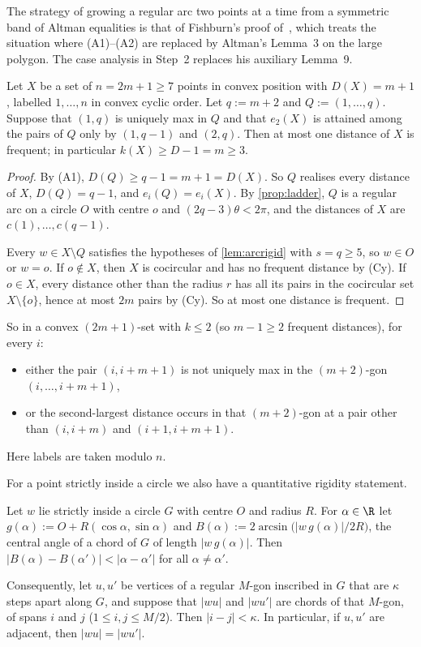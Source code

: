 The strategy of growing a regular arc two points at a time from a symmetric band of Altman equalities is that of Fishburn's proof of~\cite[Lemma~6]{Fi95}, which treats the situation where (A1)--(A2) are replaced by Altman's Lemma~3 on the large polygon. The case analysis in Step~2 replaces his auxiliary Lemma~9.

\begin{corollary}\label{cor:ladder}
Let $X$ be a set of $n=2m+1\ge7$ points in convex position with $D(X)=m+1$, labelled $1,\dots,n$ in convex cyclic order. Let $q:=m+2$ and $Q:=(1,\dots,q)$. Suppose that $(1,q)$ is uniquely max in $Q$ and that $e_2(X)$ is attained among the pairs of $Q$ only by $(1,q-1)$ and $(2,q)$. Then at most one distance of $X$ is frequent; in particular $k(X)\ge D-1=m\ge3$.
\end{corollary}

\begin{proof}
By (A1), $D(Q)\ge q-1=m+1=D(X)$. So $Q$ realises every distance of $X$, $D(Q)=q-1$, and $e_i(Q)=e_i(X)$. By \cref{prop:ladder}, $Q$ is a regular arc on a circle $O$ with centre $o$ and $(2q-3)\theta<2\pi$, and the distances of $X$ are $c(1),\dots,c(q-1)$.

Every $w\in X\setminus Q$ satisfies the hypotheses of \cref{lem:arcrigid} with $s=q\ge5$, so $w\in O$ or $w=o$. If $o\notin X$, then $X$ is cocircular and has no frequent distance by (Cy). If $o\in X$, every distance other than the radius $r$ has all its pairs in the cocircular set $X\setminus\{o\}$, hence at most $2m$ pairs by (Cy). So at most one distance is frequent.
\end{proof}

So in a convex $(2m+1)$-set with $k\le2$ (so $m-1\ge2$ frequent distances), for every $i$:
\begin{itemize}[leftmargin=2em]
\item either the pair $(i,i+m+1)$ is not uniquely max in the $(m+2)$-gon $(i,\dots,i+m+1)$,
\item or the second-largest distance occurs in that $(m+2)$-gon at a pair other than $(i,i+m)$ and $(i+1,i+m+1)$.
\end{itemize}
Here labels are taken modulo $n$.

For a point strictly inside a circle we also have a quantitative rigidity statement.

\begin{lemma}\label{lem:lipschitz}
Let $w$ lie strictly inside a circle $G$ with centre $O$ and radius $R$. For $\alpha\in\R$ let $g(\alpha):=O+R(\cos\alpha,\sin\alpha)$ and $B(\alpha):=2\arcsin\bigl(|w\,g(\alpha)|/2R\bigr)$, the central angle of a chord of $G$ of length $|w\,g(\alpha)|$. Then $|B(\alpha)-B(\alpha')|<|\alpha-\alpha'|$ for all $\alpha\ne\alpha'$.

Consequently, let $u,u'$ be vertices of a regular $M$-gon inscribed in $G$ that are $\kappa$ steps apart along $G$, and suppose that $|wu|$ and $|wu'|$ are chords of that $M$-gon, of spans $i$ and $j$ ($1\le i,j\le M/2$). Then $|i-j|<\kappa$. In particular, if $u,u'$ are adjacent, then $|wu|=|wu'|$.
\end{lemma}

